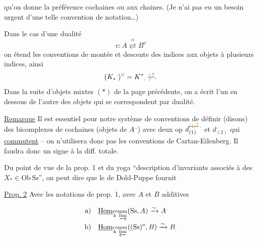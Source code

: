 qu'on donne la préférence  cochaines ou aux chaines. (Je n'ai pas eu un besoin urgent d'une telle convention de notation\ldots)

Dans le cas d'une dualité
\[
 v:A\overset{\approx}{\rightleftarrows}B^o
\]
on étend les conventions de montée et descente des indices aux objets à plusieurs indices, ainsi
\[
 (K_*{}^{.})^\vee=K^*{}_.\ \deleted{\unsure{\}}}.
\]
Dans la suite d'objets mixtes $(*)$ de la page précédente, on a écrit l'un en dessous de l'autre des objets qui se correspondent par dualité.

\uline{Remarque} Il est essentiel pour notre système de conventions de définir (disons) des bicomplexes de cochaines (objets de $A^{..}$) avec deux op  $d^{\deleted{\unsure{(1)}}\, .}_{(1)}$ et $d^{.}_{(2)}$ qui \uline{commutent} -- on n'utilisera donc pas les conventions de Cartan-Eilenberg. Il faudra donc un signe à la diff. totale.

Du point de vue de la prop. 1 et du yoga  ``description d'invariants associés à des $X_*\in\mathrm{Ob}\,\mathrm{Ss}$'', on peut dire que le  de Dold-Puppe
fournit 

\uline{Prop. 2} Avec les notations  de prop. 1, avec $A$ et $B$ additives 

\[
\begin{aligned}
\text{a)}\quad&\underline{\operatorname{Hom}}_{\substack{\text{comm}\\\text{à }\varinjlim}}(\mathrm{Ss},A)\xrightarrow{\sim} A^{.}\\
\text{b)}\quad&\underline{\operatorname{Hom}}_{\substack{\text{comm}\\\text{à }\varprojlim}}((\mathrm{Ss})^o,B)\xrightarrow{\sim} B_{.}
\end{aligned}
\]

